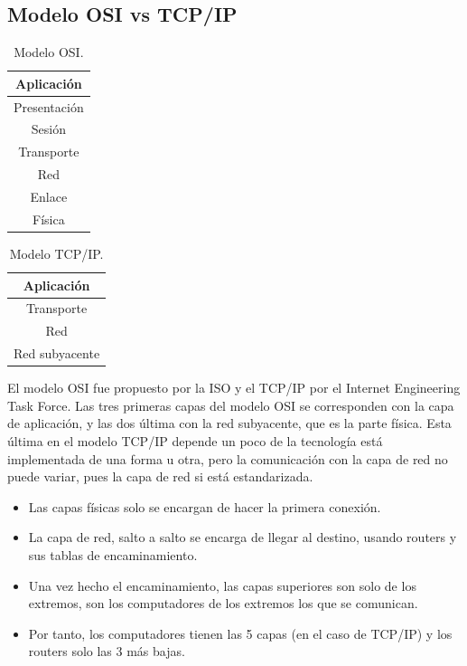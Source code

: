 \subsection{Modelo OSI vs TCP/IP}
\begin{table}[H]
\centering
\begin{tabular}{|c|}
    \hline
    Aplicación \\\hline
    Presentación \\\hline
    Sesión \\ \hline
    Transporte \\ \hline
    Red \\\hline
    Enlace \\\hline
    Física \\\hline
\end{tabular}
\caption{Modelo OSI.}
\label{tab:mod_osi}
\end{table}

\begin{table}[H]
\centering
\begin{tabular}{|c|}
    \hline
    Aplicación \\\hline
    Transporte \\ \hline
    Red \\\hline
    Red subyacente \\\hline
\end{tabular}
\caption{Modelo TCP/IP.}
\label{tab:mod_tcp}
\end{table}

El modelo \acrshort{OSI} fue propuesto por la ISO y el TCP/IP por el Internet Engineering Task Force. Las tres primeras capas del modelo OSI se corresponden con la capa de aplicación, y las dos última con la red subyacente, que es la parte física. Esta última en el modelo TCP/IP depende un poco de la tecnología está implementada de una forma u otra, pero la comunicación con la capa de red no puede variar, pues la capa de red si está estandarizada. 

\begin{itemize}
    
    \item Las capas físicas solo se encargan de hacer la primera conexión.
    \item La capa de red, salto a salto se encarga de llegar al destino, usando routers y sus tablas de encaminamiento. 
    \item Una vez hecho el encaminamiento, las capas superiores son solo de los extremos, son los computadores de los extremos los que se comunican. 
    \item Por tanto, los computadores tienen las 5 capas (en el caso de TCP/IP) y los routers solo las 3 más bajas. 
\end{itemize}


